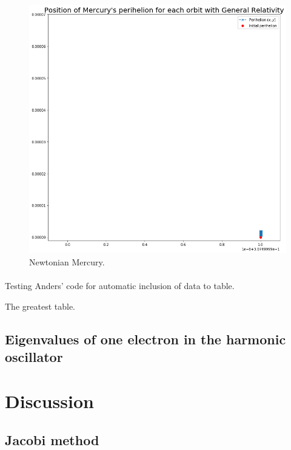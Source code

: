 \documentclass[a4paper, fontsize=11pt]{article}
\begin{document}
\begin{figure}[H]
\includegraphics[scale=0.5]{plots/NewtonianMercury}
\caption{Newtonian Mercury.}
\label{fig:NewtonianMercury}
\end{figure}

\paragraph{}
Testing Anders' code for automatic inclusion of data to table.
\begin{table}[h!tb]
    \centering
    \caption{The greatest table.}
\end{table}



\subsection{Eigenvalues of one electron in the harmonic oscillator}







\section{Discussion}
\subsection{Jacobi method}

 





\end{document}
